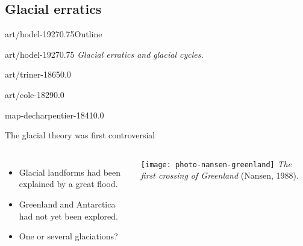 \begin{CJK}{UTF8}{min}
\subsection{Glacial erratics}

    \begin{sectionframe}{art/hodel-1927}{0.75}{Outline}
      \tableofcontents
    \end{sectionframe}

    \begin{sectionframe}{art/hodel-1927}{0.75}{\insertsectionhead}
      \emph{Glacial erratics and glacial cycles.}
    \end{sectionframe}

    \begin{backgroundframe}[t]{art/triner-1865}{0.0}{}
      \flushleft{}
    \end{backgroundframe}

    \begin{backgroundframe}[t]{art/cole-1829}{0.0}{}
      \flushleft{}
    \end{backgroundframe}

    \begin{backgroundframe}[b]{map-decharpentier-1841}{0.0}{}
      \flushleft{}
    \end{backgroundframe}

    \begin{frame}{The glacial theory was first controversial}
      \begin{columns}
        \column{60mm}
          \begin{itemize}[<+->]
            \item Glacial landforms had been explained by a great flood.
            \bigskip
            \item Greenland and Antarctica had not yet been explored.
            \bigskip
            \item One or several glaciations?
          \end{itemize}
          \texttt{[image: photo-nansen-greenland]}
          \emph{The first crossing of Greenland} (Nansen, 1988).
      \end{columns}
    \end{frame}


\end{CJK}
